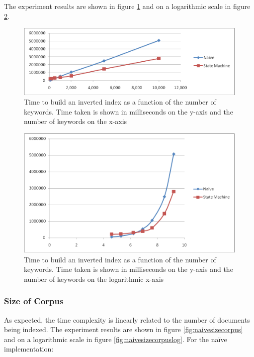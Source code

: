 \documentclass[10pt]{article}
\begin{document}
The experiment results are shown in figure \ref{fig:naivenumkeywords}
and on a logarithmic scale in figure \ref{fig:naivenumkeywordslog}.

\begin{figure}[p]
  \begin{center}
    \includegraphics[width=\textwidth,height=!]{naivenumkeywords}
  \end{center}
  \caption{Time to build an inverted index as a function of the
      number of keywords. Time taken is shown in milliseconds on the
      y-axis and the number of keywords on the x-axis}
  \label{fig:naivenumkeywords}
\end{figure} 


\begin{figure}[p]
  \begin{center}
    \includegraphics[width=\textwidth,height=!]{naivenumkeywordslog}
  \end{center}
  \caption{Time to build an inverted index as a function of the
      number of keywords. Time taken is shown in milliseconds on the
      y-axis and the number of keywords on the logarithmic x-axis}
  \label{fig:naivenumkeywordslog}
\end{figure} 


\subsubsection{Size of Corpus}
As expected, the time complexity is linearly related to the number of
documents being indexed. The experiment results are shown in figure
\ref{fig:naivesizecorpus} and on a logarithmic scale in figure
\ref{fig:naivesizecorpuslog}. For the na\"{i}ve implementation:
\end{document}
